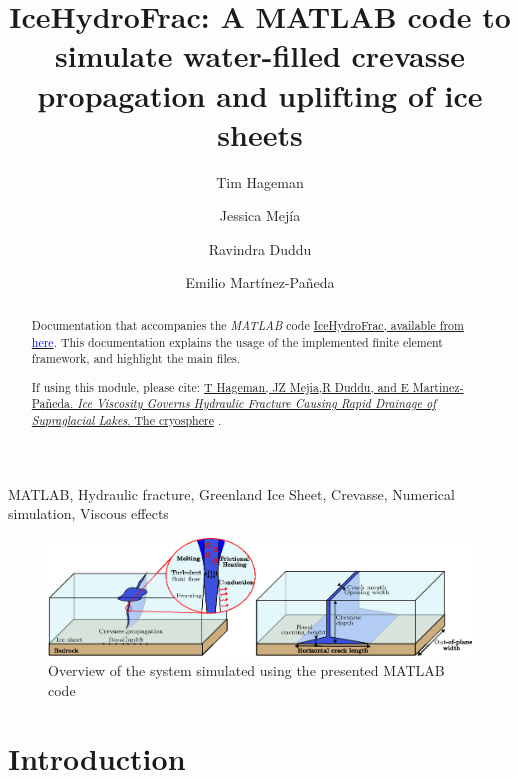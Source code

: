 \documentclass[3p]{elsarticle} %
\let\oldtodo\todo
\renewcommand{\todo}[1]{\oldtodo[inline]{#1}}
\newcommand{\citeMe}{\href{https://doi.org/10.1016/j.cma.2023.116235}{T Hageman, JZ Mejia,R Duddu, and E {Martinez-Pa{\~n}eda}. \textit{Ice Viscosity Governs Hydraulic Fracture Causing Rapid Drainage of Supraglacial Lakes}. The cryosphere} \citep{Hageman}}
\begin{document}
\begin{frontmatter}
\title{IceHydroFrac: A MATLAB code to simulate water-filled crevasse propagation and uplifting of ice sheets }

\author[1]{Tim Hageman }
\author[2]{Jessica Mejía}
\author[3]{Ravindra Duddu} 
\author[1]{Emilio Martínez-Pañeda}

\address[1]{Department of Engineering Science, University of Oxford, Oxford OX1 3PJ, UK}
\address[2]{Department of Geology, University at Buffalo, Buffalo, NY 14260, USA}
\address[3]{Department of Civil and Environmental Engineering, Department of Earth and Environmental Sciences, Vanderbilt University, Nashville, TN 37235, USA}

\begin{abstract}
Documentation that accompanies the \textit{MATLAB} code \href{https://github.com/T-Hageman/MATLAB_IceHydroFrac}{IceHydroFrac, available from \textcolor{blue}{here}}. This documentation explains the usage of the implemented finite element framework, and highlight the main files.  

If using this module, please cite: \citeMe{}.
\end{abstract}

\begin{keyword}
MATLAB, Hydraulic fracture, Greenland Ice Sheet, Crevasse, Numerical simulation, Viscous effects
\end{keyword}

\end{frontmatter}

\begin{figure}
	\centering
	\includegraphics[width=16cm]{Figures/CaseOverview.eps}
	\caption{Overview of the system simulated using the presented MATLAB code}
\end{figure}

\newpage
\tableofcontents

\newpage
{}
\section{Introduction}
\todo{Intro sentences}
\end{document}
